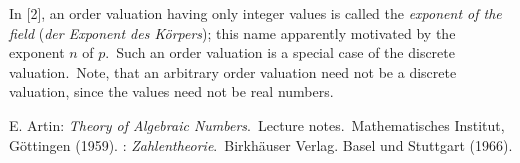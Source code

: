\documentclass[12pt]{article}
\theoremstyle{definition}
\begin{document}
In [2], an order valuation having only integer values is called the {\em exponent of the field} ({\em der Exponent des K\"orpers}); this name apparently motivated by the exponent $n$ of $p$.\, Such an order valuation is a special case of the discrete valuation.\, Note, that an arbitrary order valuation need not be a discrete valuation, since the values need not be real numbers.


\begin{thebibliography}{9}
 {\sc E. Artin}: {\em Theory of Algebraic Numbers}.\, Lecture notes.\, Mathematisches Institut, G\"ottingen (1959).
: {\em Zahlentheorie}.\, Birkh\"auser Verlag. Basel und Stuttgart (1966).

\end{thebibliography}
\end{document}
